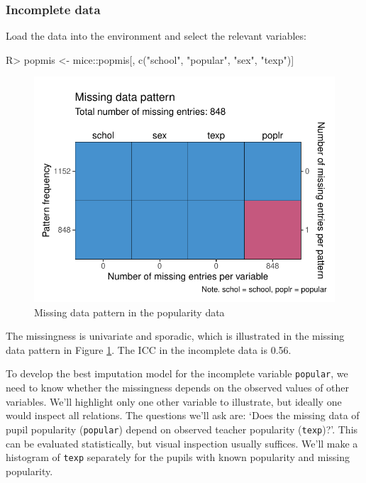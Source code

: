\documentclass[
]{jss}
\begin{document}
\hypertarget{incomplete-data}{%
\subsubsection{Incomplete data}\label{incomplete-data}}

Load the data into the environment and select the relevant variables:

\begin{CodeChunk}
\begin{CodeInput}
R> popmis <- mice::popmis[, c("school", "popular", "sex", "texp")] 
\end{CodeInput}
\end{CodeChunk}

\begin{CodeChunk}
\begin{figure}

{\centering \includegraphics{Manuscript_files/figure-latex/pop_pat-1} 

}

\caption[Missing data pattern in the popularity data]{Missing data pattern in the popularity data}\label{fig:pop_pat}
\end{figure}
\end{CodeChunk}

The missingness is univariate and sporadic, which is illustrated in the
missing data pattern in Figure \ref{fig:pop_pat}. The ICC in the
incomplete data is 0.56.

To develop the best imputation model for the incomplete variable
\texttt{popular}, we need to know whether the missingness depends on the
observed values of other variables. We'll highlight only one other
variable to illustrate, but ideally one would inspect all relations. The
questions we'll ask are: `Does the missing data of pupil popularity
(\texttt{popular}) depend on observed teacher popularity
(\texttt{texp})?'. This can be evaluated statistically, but visual
inspection usually suffices. We'll make a histogram of \texttt{texp}
separately for the pupils with known popularity and missing popularity.
\end{document}

